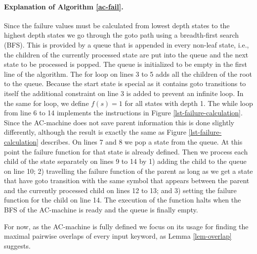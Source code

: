 \documentclass[english,twoside,censored,csm,algorithms-track-2020]{HYthesisML}
\theoremstyle{plain}
\theoremstyle{definition}
\numberwithin{testexample}{chapter}
\begin{document}
  \paragraph{Explanation of Algorithm \ref{ac-fail}.}
  Since the failure values must be calculated from lowest depth states to the highest depth states
  we go through the goto path using a breadth-first search (BFS). This is provided by a queue that is
  appended in every non-leaf state, i.e., the children of the currently processed state are put into the
  queue and the next state to be processed is popped. The queue is initialized to be empty in the first
  line of the algorithm. The for loop on lines 3 to 5 adds all the children of the root to the queue.
  Because the start state is special as it contains goto transitions to itself the additional constraint
  on line 3 is added to prevent an infinite loop. In the same for loop, we define
  $f(s)=1$ for all states with depth 1. The while loop from line 6 to 14 implements the instructions
  in Figure \ref{lst-failure-calculation}. Since the AC-machine does not save parent information
  this is done slightly differently, although the result is exactly the same as Figure
  \ref{lst-failure-calculation} describes. On lines 7 and 8 we pop a
  state from the queue. At this point the failure function for that state is already defined. Then we
  process each child of the state separately on lines 9 to 14 by 1) adding the child to the
  queue  on line 10; 2) travelling the failure function of the parent as long as we get a state
  that have goto   transition with the same symbol that appears between the parent and the currently
  processed child on lines 12 to 13; and 3) setting the failure function for the child on line 14.
  The execution of the function halts when the BFS of the  AC-machine is ready and the queue is
  finally empty.

  For now, as the AC-machine is fully defined we focus on its usage for finding the maximal pairwise
  overlaps of every input keyword, as Lemma \ref{lem-overlap} suggests.
\end{document}
